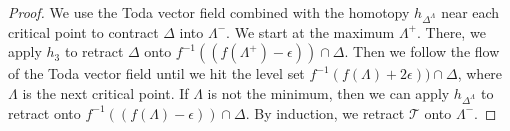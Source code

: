 \documentclass[10pt,a4paper]{amsart}
\newcommand{\cT}{\mathcal{T}}
\begin{document}
\begin{proof}
We use  the Toda vector field combined with the homotopy $h_{\Delta^\Lambda}$
near each critical point to contract $\Delta$ into $\Lambda^{-}$.
We start at the maximum $\Lambda^+$.
There, we apply $h_3$ to retract $\Delta$ onto $f^{-1}((f(\Lambda^+)-\epsilon))\cap \Delta$. Then we follow the flow of the Toda vector field until we hit the level set
$f^{-1}(f(\Lambda)+2\epsilon))\cap \Delta$, where $\Lambda$ is the next critical point. If $\Lambda$ is not the minimum, then  we can apply  $h_{\Delta^\Lambda}$ to retract onto $f^{-1}((f(\Lambda)-\epsilon))\cap \Delta$. By induction, we retract $\cT$ onto $\Lambda^{-}$.
\end{proof}
\end{document}
